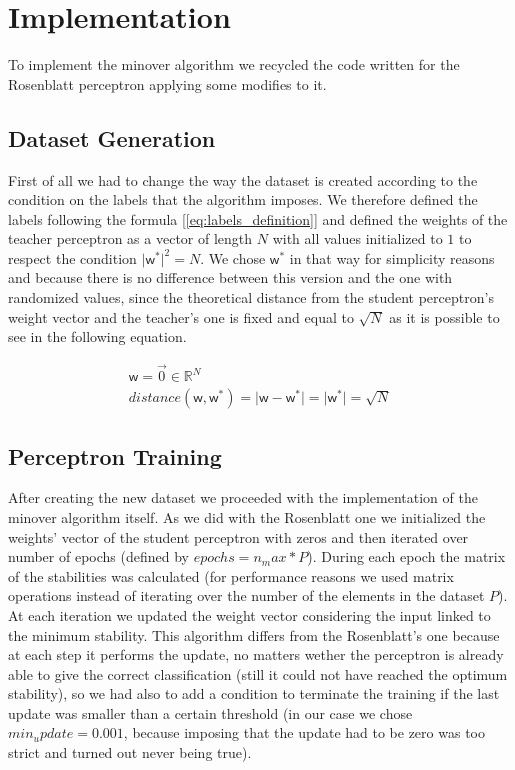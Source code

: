 \section{Implementation}
\label{sec:implementation}

To implement the minover algorithm we recycled the code written for the Rosenblatt perceptron applying some modifies to it.

\subsection{Dataset Generation}
First of all we had to change the way the dataset is created according to the condition on the labels that the algorithm imposes.
We therefore defined the labels following the formula [\ref{eq:labels_definition}] and defined the weights of the teacher perceptron
as a vector of length $N$ with all values initialized to $1$ to respect the condition $\lvert \bm{\mathsf{w}}^* \rvert^2 = N$.
We chose $\bm{\mathsf{w}}^*$ in that way for simplicity reasons and because there is no difference between this version and
the one with randomized values, since the theoretical distance from the student perceptron's weight vector and the teacher's one is
fixed and equal to $\sqrt{N}$ as it is possible to see in the following equation.

\begin{gather*}
    \bm{\mathsf{w}} = \overrightarrow{0} \in \mathbb{R}^N \\
    distance(\bm{\mathsf{w}}, \bm{\mathsf{w}}^*) = \lvert \bm{\mathsf{w}} - \bm{\mathsf{w}}^* \rvert = \lvert \bm{\mathsf{w}}^* \rvert = \sqrt{N}
\end{gather*}

\subsection{Perceptron Training}
After creating the new dataset we proceeded with the implementation of the minover algorithm itself. As we did with the Rosenblatt one
we initialized the weights' vector of the student perceptron with zeros and then iterated over number of epochs (defined by $epochs = n_max * P$).
During each epoch the matrix of the stabilities was calculated (for performance reasons we used matrix operations instead of iterating over the
number of the elements in the dataset $P$). At each iteration we updated the weight vector considering the input linked to the minimum stability.
This algorithm differs from the Rosenblatt's one because at each step it performs the update, no matters wether the perceptron is already able to give
the correct classification (still it could not have reached the optimum stability), so we had also to add a condition to terminate the training if the
last update was smaller than a certain threshold (in our case we chose $min_update = 0.001$, because imposing that the update had to be zero was too
strict and turned out never being true).

